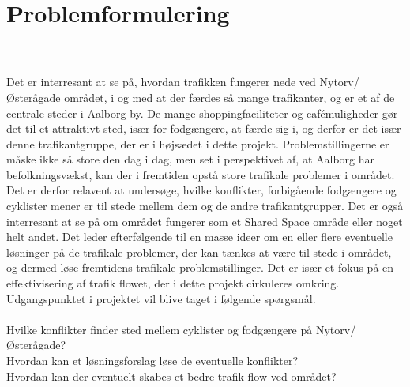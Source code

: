 \chapter{Problemformulering}
\label{chap:problemformulering}

~\\\\
Det er interresant at se på, hvordan trafikken fungerer nede ved Nytorv/Østerågade området, i og med at der færdes så mange trafikanter, og er et af de centrale steder i Aalborg by. De mange shoppingfaciliteter og cafémuligheder gør det til et attraktivt sted, især for fodgængere, at færde sig i, og derfor er det især denne trafikantgruppe, der er i højsædet i dette projekt. Problemstillingerne er måske ikke så store den dag i dag, men set i perspektivet af, at Aalborg har befolkningsvækst, kan der i fremtiden opstå store trafikale problemer i området. Det er derfor relavent at undersøge, hvilke konflikter, forbigående fodgængere og cyklister mener er til stede mellem dem og de andre trafikantgrupper.
Det er også interresant at se på om området fungerer som et Shared Space område eller noget helt andet.
Det leder efterfølgende til en masse ideer om en eller flere eventuelle løsninger på de trafikale problemer, der kan tænkes at være til stede i området, og dermed løse fremtidens trafikale problemstillinger. Det er især et fokus på en effektivisering af trafik flowet, der i dette projekt cirkuleres omkring. Udgangspunktet i projektet vil blive taget i følgende spørgsmål.
\\\\
Hvilke konflikter finder sted mellem cyklister og fodgængere på Nytorv/Østerågade?
\\
Hvordan kan et løsningsforslag løse de eventuelle konflikter?
\\
Hvordan kan der eventuelt skabes et bedre trafik flow ved området?
\\\\

